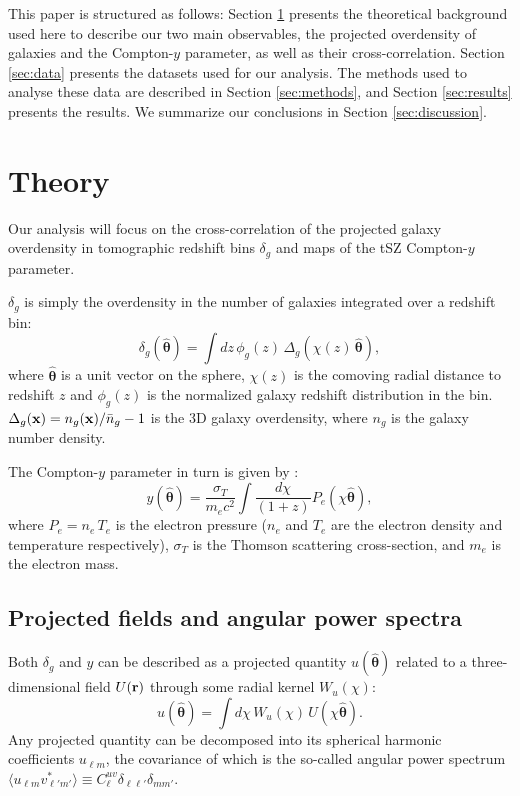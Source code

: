 \documentclass[useAMS,usenatbib]{mn2e}
\newcommand{\nv}{\hat{\boldsymbol{\theta}}}
\begin{document}
  This paper is structured as follows: Section \ref{sec:theory} presents the theoretical background used here to describe our two main observables, the projected overdensity of galaxies and the Compton-$y$ parameter, as well as their cross-correlation. Section \ref{sec:data} presents the datasets used for our analysis. The methods used to analyse these data are described in Section \ref{sec:methods}, and Section \ref{sec:results} presents the results. We summarize our conclusions in Section \ref{sec:discussion}.

\section{Theory}\label{sec:theory}
    Our analysis will focus on the cross-correlation of the projected galaxy overdensity in tomographic redshift bins $\delta_g$ and maps of the tSZ Compton-$y$ parameter.
    
    $\delta_g$ is simply the overdensity in the number of galaxies integrated over a redshift bin:
    \begin{equation}
      \delta_g(\nv)=\int dz\,\phi_g(z)\,\Delta_g(\chi(z)\,\nv),
    \end{equation}
    where $\nv$ is a unit vector on the sphere, $\chi(z)$ is the comoving radial distance to redshift $z$ and $\phi_g(z)$ is the normalized galaxy redshift distribution in the bin. $\Delta_g({\bf x})=n_g({\bf x})/\bar{n}_g-1$ is the 3D galaxy overdensity, where $n_g$ is the galaxy number density.
    
    The Compton-$y$ parameter in turn is given by \citep{1972CoASP...4..173S}:
    \begin{equation}
      y(\nv)=\frac{\sigma_T}{m_ec^2}\int \frac{d\chi}{(1+z)} P_e(\chi\nv),
    \end{equation}
    where $P_e=n_e\,T_e$ is the electron pressure ($n_e$ and $T_e$ are the electron density and temperature respectively), $\sigma_T$ is the Thomson scattering cross-section, and $m_e$ is the electron mass.
    
  \subsection{Projected fields and angular power spectra}\label{ssec:theory.cls}    
    Both $\delta_g$ and $y$ can be described as a projected quantity $u(\nv)$ related to a three-dimensional field $U({\bf r})$ through some radial kernel $W_u(\chi)$:
    \begin{equation}
      u(\nv)=\int d\chi\,W_u(\chi)\,U(\chi\nv).
    \end{equation}
    Any projected quantity can be decomposed into its spherical harmonic coefficients $u_{\ell m}$, the covariance of which is the so-called angular power spectrum $\langle u_{\ell m}v^*_{\ell' m'}\rangle\equiv C^{uv}_\ell\delta_{\ell\ell'}\delta_{mm'}$.
\end{document}
